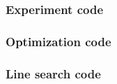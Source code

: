 \documentclass{article}
\begin{document}
\subsubsection{Experiment code}


\subsubsection{Optimization code}


\subsubsection{Line search code}




% 
% 
\end{document}
